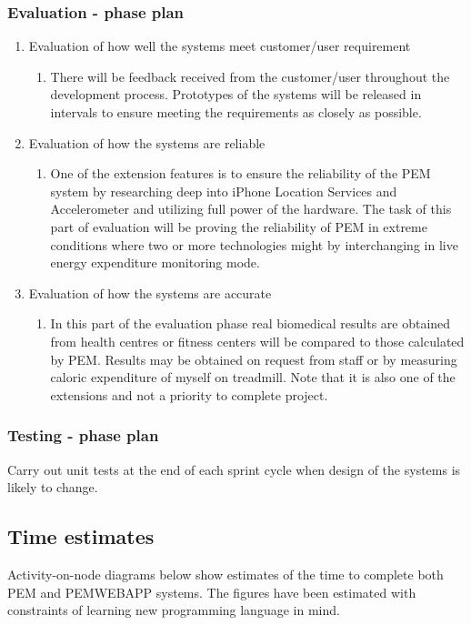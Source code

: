 \documentclass[12pt, a4paper]{report}   %
\begin{document}
\begin{enumerate}
\subsubsection{Evaluation - phase plan}
\begin{enumerate}
	\item Evaluation of how well the systems meet customer/user requirement
		\begin{enumerate}
			\item There will be feedback received from the customer/user throughout the development process. Prototypes of the systems will be released in intervals to ensure meeting the requirements as closely as possible.
		\end{enumerate}
	\item Evaluation of how the systems are reliable
		\begin{enumerate}
			\item One of the extension features is to ensure the reliability of the PEM system by researching deep into iPhone Location Services and Accelerometer and utilizing full power of the hardware. The task of this part of evaluation will be proving the reliability of PEM in extreme conditions where two or more technologies might by interchanging in live energy expenditure monitoring mode.
		\end{enumerate}
	\item Evaluation of how the systems are accurate
		\begin{enumerate}
			\item In this part of the evaluation phase real biomedical results are obtained from health centres or fitness centers will be compared to those calculated by PEM. Results may be obtained on request from staff or by measuring caloric expenditure of myself on treadmill. Note that it is also one of the extensions and not a priority to complete project.
		\end{enumerate}
\end{enumerate}


\subsubsection{Testing - phase plan}
Carry out unit tests at the end of each sprint cycle when design of the systems is likely to change.


\subsection{Time estimates}
Activity-on-node diagrams below show estimates of the time to complete both PEM and PEMWEBAPP systems. The figures have been estimated with constraints of learning new programming language in mind.


\end{enumerate}
\end{document}
